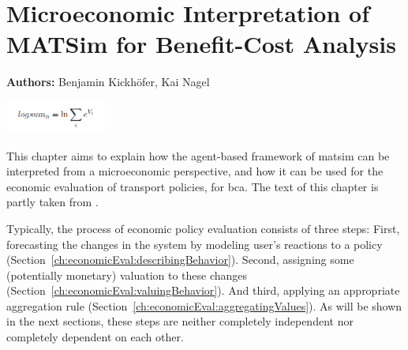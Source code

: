 \chapter{Microeconomic Interpretation of MATSim for Benefit-Cost Analysis}
\label{ch:economicEval}

\hfill \textbf{Authors:} Benjamin Kickhöfer, Kai Nagel

\begin{center} \includegraphics[width=0.25\textwidth, angle=0]{understanding/figures/logsum} \end{center}


This chapter aims to explain how the agent-based framework of \acrshort{matsim} can be interpreted from a micro\-economic perspective, and how it can be used for the economic evaluation of transport policies, \eg for \gls{bca}. The text of this chapter is partly taken from \citet[][Section~2.3]{Kickhoefer_PhDThesis_2014}.

Typically, the process of economic policy evaluation consists of three steps:
%
First, forecasting the changes in the system by modeling user's reactions to a policy
(Section~\ref{ch:economicEval:describingBehavior}).
%
Second, assigning some (potentially monetary) valuation to these changes (Section~\ref{ch:economicEval:valuingBehavior}).
%
And third, applying an appropriate aggregation rule (Section~\ref{ch:economicEval:aggregatingValues}).
%
As will be shown in the next sections, these steps are neither completely independent nor completely dependent on each other.

